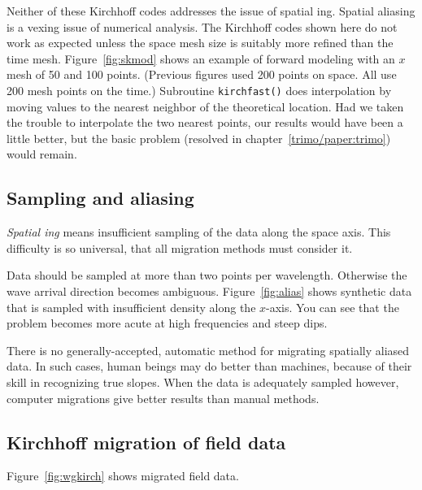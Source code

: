 \par
Neither of these Kirchhoff codes addresses the issue of spatial ing.
Spatial aliasing is a vexing issue of numerical analysis.
The Kirchhoff codes shown here do not work as expected
unless the space mesh size is suitably more refined than the time mesh.
Figure~\ref{fig:skmod} shows an example of forward modeling
with an $x$ mesh of 50 and 100 points. %
(Previous figures used 200 points on space.
All use 200 mesh points on the time.)
Subroutine \texttt{kirchfast()}  does interpolation by moving values
to the nearest neighbor of the theoretical location.
Had we taken the trouble to interpolate the two nearest points,
our results would have been a little better,
but the basic problem (resolved in chapter~\ref{trimo/paper:trimo}) would remain.

\subsection{Sampling and aliasing}
{\em 
Spatial ing
}
means insufficient sampling of the data along the space axis.
This difficulty is so universal, that all migration methods
must consider it.
\par
Data should be sampled at more than two points per wavelength.
Otherwise the wave arrival direction becomes ambiguous.
Figure~\ref{fig:alias} shows synthetic data that is
sampled with insufficient density along the $x$-axis.
You can see that the problem becomes more acute at high frequencies 
and steep dips.
\par
There is no generally-accepted, automatic method for migrating
spatially aliased data.
In such cases, human beings may do better than machines,
because of their skill in recognizing true slopes.
When the data is adequately sampled however, computer migrations
give better results than manual methods.

\subsection{Kirchhoff migration of field data}
Figure~\ref{fig:wgkirch} shows migrated field data.

